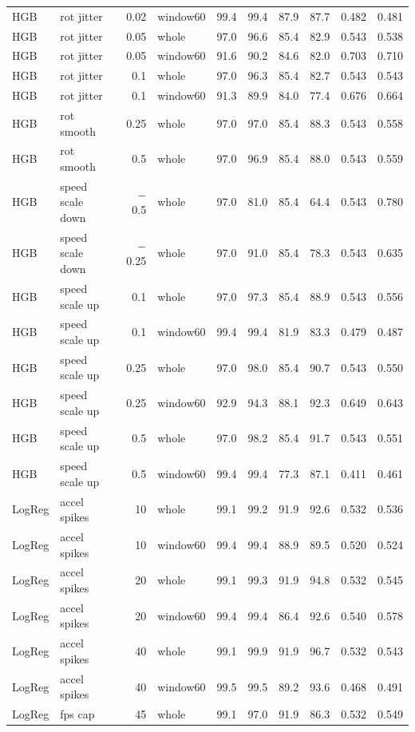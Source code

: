 \begin{longtable}{llrlrrrrrr}
HGB & rot jitter & 0.02 & window60 & 99.4 & 99.4 & 87.9 & 87.7 & 0.482 & 0.481 \\
HGB & rot jitter & 0.05 & whole & 97.0 & 96.6 & 85.4 & 82.9 & 0.543 & 0.538 \\
HGB & rot jitter & 0.05 & window60 & 91.6 & 90.2 & 84.6 & 82.0 & 0.703 & 0.710 \\
HGB & rot jitter & 0.1 & whole & 97.0 & 96.3 & 85.4 & 82.7 & 0.543 & 0.543 \\
HGB & rot jitter & 0.1 & window60 & 91.3 & 89.9 & 84.0 & 77.4 & 0.676 & 0.664 \\
HGB & rot smooth & 0.25 & whole & 97.0 & 97.0 & 85.4 & 88.3 & 0.543 & 0.558 \\
HGB & rot smooth & 0.5 & whole & 97.0 & 96.9 & 85.4 & 88.0 & 0.543 & 0.559 \\
HGB & speed scale down & $-$0.5 & whole & 97.0 & 81.0 & 85.4 & 64.4 & 0.543 & 0.780 \\
HGB & speed scale down & $-$0.25 & whole & 97.0 & 91.0 & 85.4 & 78.3 & 0.543 & 0.635 \\
HGB & speed scale up & 0.1 & whole & 97.0 & 97.3 & 85.4 & 88.9 & 0.543 & 0.556 \\
HGB & speed scale up & 0.1 & window60 & 99.4 & 99.4 & 81.9 & 83.3 & 0.479 & 0.487 \\
HGB & speed scale up & 0.25 & whole & 97.0 & 98.0 & 85.4 & 90.7 & 0.543 & 0.550 \\
HGB & speed scale up & 0.25 & window60 & 92.9 & 94.3 & 88.1 & 92.3 & 0.649 & 0.643 \\
HGB & speed scale up & 0.5 & whole & 97.0 & 98.2 & 85.4 & 91.7 & 0.543 & 0.551 \\
HGB & speed scale up & 0.5 & window60 & 99.4 & 99.4 & 77.3 & 87.1 & 0.411 & 0.461 \\
LogReg & accel spikes & 10 & whole & 99.1 & 99.2 & 91.9 & 92.6 & 0.532 & 0.536 \\
LogReg & accel spikes & 10 & window60 & 99.4 & 99.4 & 88.9 & 89.5 & 0.520 & 0.524 \\
LogReg & accel spikes & 20 & whole & 99.1 & 99.3 & 91.9 & 94.8 & 0.532 & 0.545 \\
LogReg & accel spikes & 20 & window60 & 99.4 & 99.4 & 86.4 & 92.6 & 0.540 & 0.578 \\
LogReg & accel spikes & 40 & whole & 99.1 & 99.9 & 91.9 & 96.7 & 0.532 & 0.543 \\
LogReg & accel spikes & 40 & window60 & 99.5 & 99.5 & 89.2 & 93.6 & 0.468 & 0.491 \\
LogReg & fps cap & 45 & whole & 99.1 & 97.0 & 91.9 & 86.3 & 0.532 & 0.549 \\

\end{longtable}
